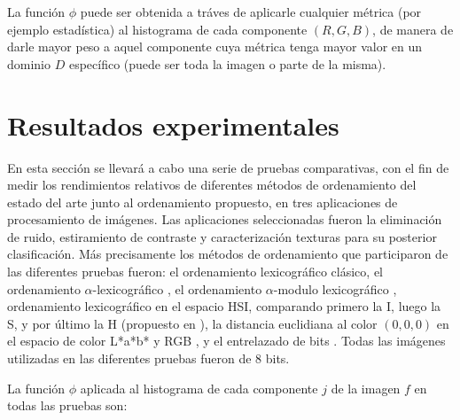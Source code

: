 La funci\'on $\phi$ puede ser obtenida a tr\'aves de aplicarle cualquier m\'etrica (por ejemplo estad\'istica) al histograma de cada componente  $(R,G,B)$, de manera de darle mayor peso a aquel componente cuya m\'etrica tenga mayor valor en un dominio $D$ espec\'ifico (puede ser toda la imagen o parte de la misma). 

 \section{Resultados experimentales}
En esta secci\'on se llevar\'a a cabo una serie de pruebas comparativas, con el fin de medir los rendimientos relativos de diferentes m\'etodos de ordenamiento del estado del arte junto al  ordenamiento propuesto, en tres aplicaciones de procesamiento de im\'agenes. Las aplicaciones seleccionadas fueron la eliminaci\'on de ruido, estiramiento de contraste y caracterización texturas para su posterior clasificación.
M\'as precisamente los m\'etodos de ordenamiento que participaron de las diferentes pruebas fueron:
el ordenamiento lexicogr\'afico cl\'asico, el ordenamiento $\alpha$-lexicogr\'afico \cite{zamora2001comparative}, el ordenamiento $\alpha$-modulo lexicogr\'afico \cite{angulo2003morphological}, ordenamiento lexicogr\'afico en el espacio HSI, comparando primero la I, luego la S, y por último la H (propuesto en \cite{ortiz2004gaussian}), la distancia euclidiana al color $(0,0,0)$ en el espacio de color L*a*b* y RGB \cite{ortiz2002procesamiento}, y el entrelazado de bits \cite{chanussot1997bit}. 
Todas las im\'agenes utilizadas en las diferentes pruebas fueron de $8$ bits. 

La funci\'on $\phi$ aplicada al histograma de cada componente $j$ de la imagen $f$ en todas las pruebas son:

